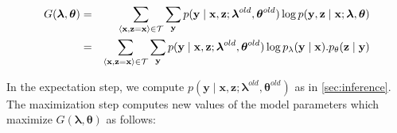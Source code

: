 \documentclass[11pt,onecolumn]{article}
\begin{document}
\begin{eqnarray}
G(\boldsymbol{\lambda}, \boldsymbol{\theta}) &=& 
  \sum_{\langle\mathbf{x},\mathbf{z}=\mathbf{x}\rangle \in \cal{T}} 
    \sum_\mathbf{y} 
      p(\mathbf{y}\mid\mathbf{x}, \mathbf{z}; \boldsymbol{\lambda}^{old}, \boldsymbol{\theta}^{old}) 
      \log
        p(\mathbf{y}, \mathbf{z} \mid \mathbf{x}; \boldsymbol{\lambda}, \boldsymbol{\theta}) \\
&=& 
  \sum_{\langle\mathbf{x},\mathbf{z}=\mathbf{x}\rangle \in \cal{T}} 
    \sum_\mathbf{y} 
      p(\mathbf{y}\mid\mathbf{x}, \mathbf{z}; \boldsymbol{\lambda}^{old}, \boldsymbol{\theta}^{old}) 
      \log
        p_\lambda(\mathbf{y} \mid \mathbf{x}) 
        . p_\theta(\mathbf{z} \mid \mathbf{y}) \\
\end{eqnarray}

In the expectation step, we compute $p(\mathbf{y}\mid\mathbf{x}, \mathbf{z}; \boldsymbol{\lambda}^{old}, \boldsymbol{\theta}^{old})$ as in \ref{sec:inference}. \\

The maximization step computes new values of the model parameters which maximize $G(\boldsymbol{\lambda}, \boldsymbol{\theta})$ as follows:
\end{document}
